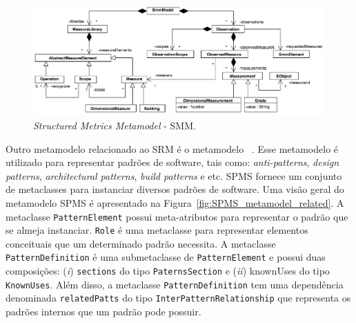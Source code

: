 \begin{figure}[h]
	\centering
	\caption{\textit{Structured Metrics Metamodel} - SMM.}
	\label{fig:SMM_metamodel_related}
	\includegraphics[scale=0.45]{images/SMM_metamodelo_related}
\end{figure}


Outro metamodelo relacionado ao SRM é o metamodelo ~\cite{ADM:SPMS}. Esse metamodelo é utilizado para representar padrões de software, tais como: \textit{anti-patterns}, \textit{design patterns}, \textit{architectural patterns}, \textit{build patterns} e etc. SPMS fornece um conjunto de metaclasses para instanciar diversos padrões de software. Uma visão geral do metamodelo SPMS é apresentado na Figura~\ref{fig:SPMS_metamodel_related}. A metaclasse \texttt{PatternElement} possui meta-atributos para representar o padrão que se almeja instanciar. \texttt{Role} é uma metaclasse para representar elementos conceituais que um determinado padrão necessita. A metaclasse \texttt{PatternDefinition} é uma submetaclasse de \texttt{PatternElement} e possui duas composições: (\textit{i}) \texttt{sections} do tipo \texttt{PaternsSection} e (\textit{ii}) knownUses do tipo \texttt{KnownUses}. Além disso, a metaclasse \texttt{PatternDefinition} tem uma dependência denominada \texttt{relatedPatts} do tipo \texttt{InterPatternRelationship} que representa os padrões internos que um padrão pode possuir.
 

